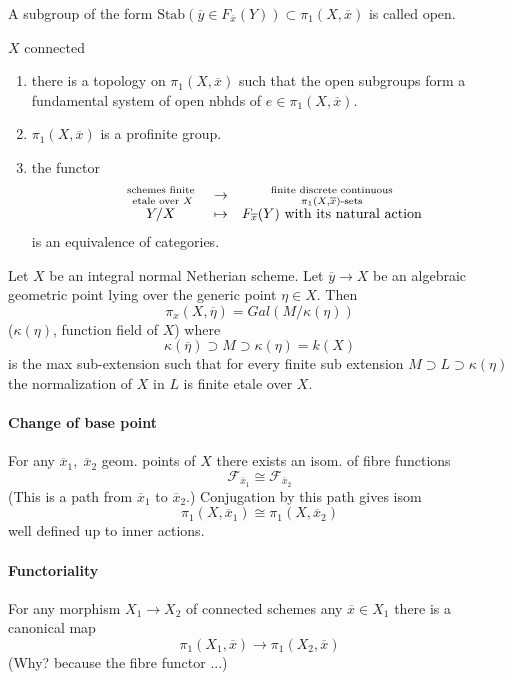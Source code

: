 \begin{definition}A subgroup of the form $\text{Stab}(\overline y\in F_{\overline x}(Y))\subset \pi_1(X, \overline x)$ is called open.
\end{definition}

\begin{theorem} $X$ connected
	\begin{enumerate}
	\item there is a topology on $\pi_1(X, \overline x)$ such that the open subgroups form a fundamental system of open nbhds of $e\in \pi_1(X, \overline x)$.
	\item $\pi_1(X, \overline x)$ is a profinite group.
	\item the functor 
		$$\begin{array}{cccccc}
		\text{ schemes finite }\atop \text{ etale over }X & \to & \text{ finite discrete continuous }\atop \pi_1(X, \overline x)\text{-sets}\\
		Y /  X& \mapsto & F_{\overline x}(Y) \text{ with its natural action}
		\end{array}$$
		is an equivalence of categories. 
	\end{enumerate}
\end{theorem}

\begin{proposition} Let $X$ be an integral normal Netherian scheme. Let $\overline y\to X$ be an algebraic geometric point lying over the generic point $\eta\in X$. Then
	$$\pi_x(X, \overline \eta) = Gal(M/\kappa(\eta))$$
	($\kappa(\eta)$, function field of $X$) where
	$$\kappa(\overline \eta)\supset M\supset \kappa(\eta) = k(X)$$
	is the max sub-extension such that for every finite sub extension $M\supset L\supset \kappa(\eta)$ the normalization of $X$ in $L$ is finite etale over $X$. 
\end{proposition}

\paragraph{Change of base point} For any $\overline x_1, \; \overline x_2$  geom. points of $X$ there exists an isom. of fibre functions
	$$\mathcal{F}_{\overline x_1} \cong \mathcal{F}_{\overline x_2}$$
	(This is a path from $\overline x_1$ to $\overline x_2$.) Conjugation by this path gives isom
		$$\pi_1(X, \overline x_1) \cong \pi_1(X, \overline x_2)$$
		well defined up to inner actions. 

\paragraph{Functoriality} For any morphism $X_1\to X_2$ of connected schemes any $\overline x\in X_1$ there is a canonical map
	$$\pi_1(X_1, \overline x) \to \pi_1(X_2, \overline x)$$
(Why? because the fibre functor ...)

